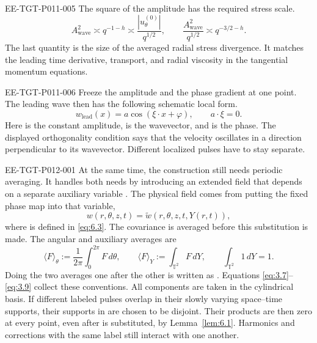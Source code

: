 \begin{EESegment}{EE-TGT-P011-005}
The square of the amplitude has the required stress scale.
\[
 A_{\mathrm{wave}}^2\asymp q^{-1-h}\asymp
 \frac{|u_\theta^{(0)}|}{q^{1/2}},
 \qquad
 \frac{A_{\mathrm{wave}}^2}{q^{1/2}}\asymp q^{-3/2-h}.
\]
The last quantity is the size of the averaged radial stress divergence. It matches the leading
time derivative, transport, and radial viscosity in the tangential momentum equations.
\end{EESegment}

\begin{EESegment}{EE-TGT-P011-006}
Freeze the amplitude and the phase gradient at one point. The leading wave then has the following
schematic local form.
\[
 w_{\mathrm{lead}}(x)=a\cos(\xi\cdot x+\varphi),\qquad a\cdot\xi=0.
\]
Here  is the constant amplitude,
 is the wavevector, and
 is the phase. The displayed orthogonality condition says
that the velocity oscillates in a direction perpendicular to its wavevector. Different localized
pulses have to stay separate.
\end{EESegment}
%
\begin{EESegment}{EE-TGT-P012-001}
At the same time, the construction still needs periodic averaging. It handles both needs by
introducing an extended field
 that depends on a separate auxiliary variable
. The physical field comes from putting the fixed phase map
into that variable,
\[
 w(r,\theta,z,t)=\widetilde w(r,\theta,z,t,Y(r,t)),
\]
where  is defined in \eqref{eq:6.3}. The covariance is averaged before
this substitution is made. The angular and auxiliary averages are
\[
 \langle F\rangle_\theta:=\frac1{2\pi}\int_0^{2\pi}F\,d\theta,
 \qquad
 \langle F\rangle_Y:=\int_{\mathbb T^2}F\,dY,
 \qquad
 \int_{\mathbb T^2}1\,dY=1.
\]
Doing the two averages one after the other is written as
. Equations
\eqref{eq:3.7}--\eqref{eq:3.9} collect these conventions. All components are taken in the
cylindrical basis. If different labeled pulses overlap in their slowly varying space--time
supports, their supports in  are chosen to be disjoint. Their products are
then zero at every point, even after  is substituted, by
Lemma~\ref{lem:6.1}. Harmonics and corrections with the same label still interact with one another.
\end{EESegment}

